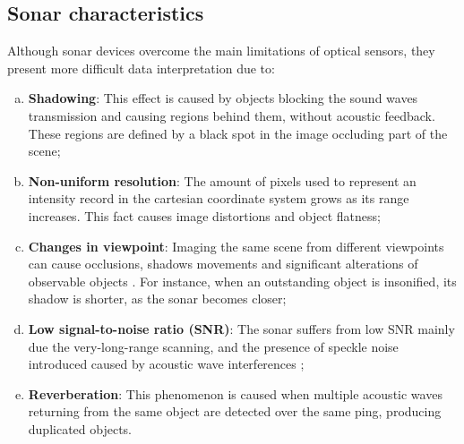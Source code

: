 \documentclass[final,5p,times]{elsarticle}
\begin{document}

\subsection{Sonar characteristics}
\label{sonar:characteristics}

Although sonar devices overcome the main limitations of optical sensors, they
present more difficult data interpretation due to:

\begin{enumerate}[(a)]
    \item \textbf{Shadowing}: This effect is caused by objects blocking the
    sound waves transmission and causing regions behind them, without acoustic
    feedback. These regions are defined by a black spot in the image
    occluding part of the scene;
    \item \textbf{Non-uniform resolution}: The amount of pixels used to
    represent an intensity record in the cartesian coordinate system grows as
    its range increases. This fact causes image distortions and object flatness;
    \item \textbf{Changes in viewpoint}: Imaging the same scene from different
    viewpoints can cause occlusions, shadows movements and significant
    alterations of observable objects \cite{hurtos2014}. For instance, when an
    outstanding object is insonified, its shadow is shorter, as the sonar
    becomes closer;
    \item \textbf{Low signal-to-noise ratio (SNR)}: The sonar suffers from low
    SNR mainly due the very-long-range scanning, and the presence of speckle
    noise introduced caused by acoustic wave interferences \cite{abbott1979};
    \item \textbf{Reverberation}: This phenomenon is caused when multiple acoustic
    waves returning from the same object are detected over the same ping,
    producing duplicated objects.
\end{enumerate}
\end{document}
